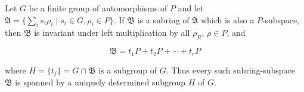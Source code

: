 Let $G$ be a finite group of automorphisms of $P$ and let $\mathfrak{A} = \{\sum_{i} s_i \rho_i \mid s_i \in G, \rho_i \in P\}$. If $\mathfrak{B}$ is a subring of $\mathfrak{A}$ which is also a $P$-subspace, then $\mathfrak{B}$ is invariant under left multiplication by all $\rho_R$, $\rho \in P$, and

$$\mathfrak{B} = t_1 P + t_2 P + \cdots + t_r P$$

where $H = \{t_j\} = G \cap \mathfrak{B}$ is a subgroup of $G$. Thus every such subring-subspace $\mathfrak{B}$ is spanned by a uniquely determined subgroup $H$ of $G$.
